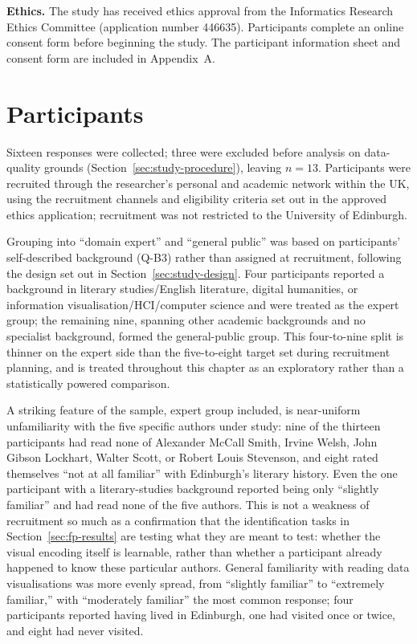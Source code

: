 \documentclass[logo,msc]{infthesis}
\begin{document}
\textbf{Ethics.} The study has received ethics approval from the Informatics Research Ethics Committee (application number 446635). Participants complete an online consent form before beginning the study. The participant information sheet and consent form are included in Appendix~A.
 
\section{Participants}

Sixteen responses were collected; three were excluded before analysis on data-quality grounds (Section~\ref{sec:study-procedure}), leaving $n=13$. Participants were recruited through the researcher's personal and academic network within the UK, using the recruitment channels and eligibility criteria set out in the approved ethics application; recruitment was not restricted to the University of Edinburgh.

Grouping into ``domain expert'' and ``general public'' was based on participants' self-described background (Q-B3) rather than assigned at recruitment, following the design set out in Section~\ref{sec:study-design}. Four participants reported a background in literary studies/English literature, digital humanities, or information visualisation/HCI/computer science and were treated as the expert group; the remaining nine, spanning other academic backgrounds and no specialist background, formed the general-public group. This four-to-nine split is thinner on the expert side than the five-to-eight target set during recruitment planning, and is treated throughout this chapter as an exploratory rather than a statistically powered comparison.

A striking feature of the sample, expert group included, is near-uniform unfamiliarity with the five specific authors under study: nine of the thirteen participants had read none of Alexander McCall Smith, Irvine Welsh, John Gibson Lockhart, Walter Scott, or Robert Louis Stevenson, and eight rated themselves ``not at all familiar'' with Edinburgh's literary history. Even the one participant with a literary-studies background reported being only ``slightly familiar'' and had read none of the five authors. This is not a weakness of recruitment so much as a confirmation that the identification tasks in Section~\ref{sec:fp-results} are testing what they are meant to test: whether the visual encoding itself is learnable, rather than whether a participant already happened to know these particular authors. General familiarity with reading data visualisations was more evenly spread, from ``slightly familiar'' to ``extremely familiar,'' with ``moderately familiar'' the most common response; four participants reported having lived in Edinburgh, one had visited once or twice, and eight had never visited.
\end{document}
